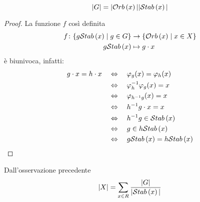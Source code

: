 \begin{multicols}{2}
\begin{prop}
	\[ |G| = |\Orb{x}||\Stab{x}| \]
\end{prop}
\begin{proof}
	La funzione $ f $ così definita
	\begin{align*}
	f \colon \{ g \Stab{x} \mid g \in G \} &\to \{\Orb{x} \mid x \in X\} \\
	g\Stab{x} &\mapsto g \cdot x
	\end{align*}
	è biunivoca, infatti:
	\begin{align*}
		g \cdot x = h \cdot x & \LR \varphi_g(x) = \varphi_h(x) \\
		& \LR \varphi_h^{-1} \varphi_g (x) = x \\
		& \LR\varphi_{h^{-1}g} (x) = x \\
		& \LR h^{-1}g \cdot x = x \\
		& \LR h^{-1}g \in \Stab{x} \\
		& \LR g \in h\Stab{x} \\
		& \LR g\Stab{x} = h\Stab{x}
	\end{align*}
\end{proof}
\begin{remark}
	Dall'osservazione precedente \[ |X| = \sum_{x \in R} \frac{|G|}{|\Stab{x}|} \]
\end{remark}


\end{multicols}
